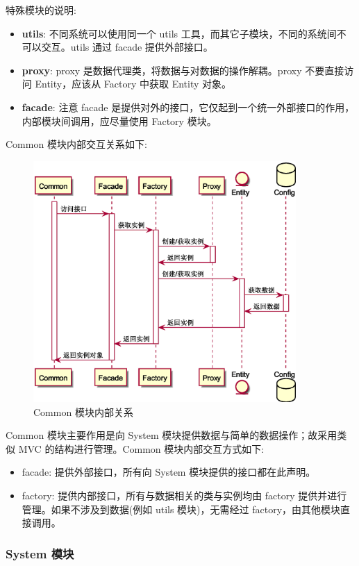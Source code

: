特殊模块的说明:
\begin{itemize}
    \item \textbf{utils}: 不同系统可以使用同一个 utils 工具，而其它子模块，不同的系统间不可以交互。utils 通过 facade 提供外部接口。
    \item \textbf{proxy}: proxy 是数据代理类，将数据与对数据的操作解耦。proxy 不要直接访问 Entity，应该从 Factory 中获取 Entity 对象。
    \item \textbf{facade}: 注意 facade 是提供对外的接口，它仅起到一个统一外部接口的作用，内部模块间调用，应尽量使用 Factory 模块。
\end{itemize}

Common 模块内部交互关系如下:

\begin{figure}[H]
    \scriptsize
    \centering
    \includegraphics[width=10cm]{images/puml/common.eps} 
    \caption{Common 模块内部关系}
    \label{fig:Common 模块内部关系}
\end{figure}

Common 模块主要作用是向 System 模块提供数据与简单的数据操作；故采用类似 MVC 的结构进行管理。Common 模块内部交互方式如下:
\begin{itemize}
    \item facade: 提供外部接口，所有向 System 模块提供的接口都在此声明。
    \item factory: 提供内部接口，所有与数据相关的类与实例均由 factory 提供并进行管理。如果不涉及到数据(例如 utils 模块)，无需经过 factory，由其他模块直接调用。
\end{itemize}

\subsubsection{System 模块}

